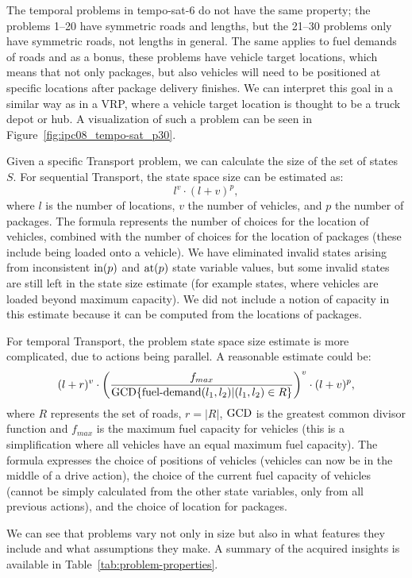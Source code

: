 The temporal problems in tempo-sat-6 do not have the same property;
the problems 1--20 have symmetric roads and lengths, but
the 21--30 problems only have symmetric roads, not lengths in general.
The same applies to fuel demands of roads and as a bonus,
these problems have vehicle target locations, which means that not only packages,
but also
vehicles will need to be positioned at specific locations
after package delivery finishes. We can interpret this goal
in a similar way as in a VRP, where a vehicle target location is thought to be
a truck depot or hub. A visualization of such a problem can be seen in Figure~\ref{fig:ipc08_tempo-sat_p30}.

Given a specific Transport problem, we can calculate the size of the set of states $S$.
For sequential Transport, the state space size can be estimated as: $$l^v \cdot (l+v)^p,$$ where $l$ is the number of locations,
$v$ the number of vehicles, and $p$ the number of packages. The formula represents
the number of choices for the location of vehicles, combined with the number of choices
for the location of packages (these include being loaded onto a vehicle). We have eliminated
invalid states arising from inconsistent $\textrm{in}(p)$ and $\textrm{at}(p)$ state variable values,
but some invalid states are still left in the state size estimate (for example states,
where vehicles are loaded beyond maximum capacity). We did not include a notion of
capacity in this estimate because it can be computed from the locations of packages.

For temporal Transport, the problem state space size estimate is more complicated,
due to actions being parallel. A reasonable estimate could be:
$$(l+r)^v \cdot \left(\frac{f_{max}}{\textrm{GCD} \{\textrm{fuel-demand}(l_1, l_2) | (l_1, l_2) \in R\}}\right)^v \cdot (l+v)^p,$$ where $R$ represents the set of roads, $r = |R|$,
$\textrm{GCD}$ is the greatest common divisor function
and $f_{max}$ is the maximum fuel capacity for vehicles (this is a simplification where all vehicles
have an equal maximum fuel capacity).
The formula expresses the choice of positions of vehicles (vehicles can now be in the middle
of a drive action), the choice of the current fuel capacity of vehicles (cannot be simply
calculated from the other state variables, only from all previous actions),
and the choice of location for packages.

We can see that problems vary not only in size but also in what features they include
and what assumptions they make.
A summary of the acquired insights is available in Table~\ref{tab:problem-properties}.

